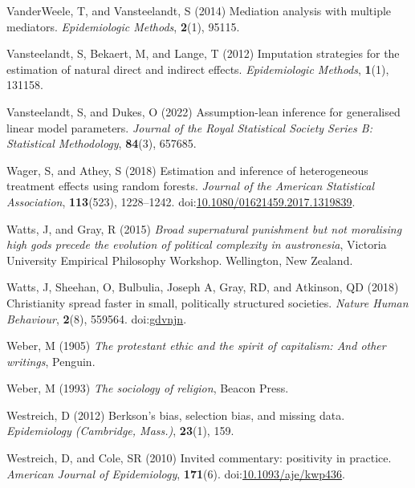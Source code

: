 \documentclass[
  singlecolumn]{article}
\newlength{\cslhangindent}
\newenvironment{CSLReferences}[2] %
 {\begin{list}{}{%
  \setlength{\itemindent}{0pt}
  \setlength{\leftmargin}{0pt}
  \setlength{\parsep}{0pt}
  \ifodd #1
   \setlength{\leftmargin}{\cslhangindent}
   \setlength{\itemindent}{-1\cslhangindent}
  \fi
  \setlength{\itemsep}{#2\baselineskip}}}
 {\end{list}}
\begin{document}
\begin{CSLReferences}{1}{0}
VanderWeele, T, and Vansteelandt, S (2014) Mediation analysis with
multiple mediators. \emph{Epidemiologic Methods}, \textbf{2}(1), 95115.

Vansteelandt, S, Bekaert, M, and Lange, T (2012) Imputation strategies
for the estimation of natural direct and indirect effects.
\emph{Epidemiologic Methods}, \textbf{1}(1), 131158.

Vansteelandt, S, and Dukes, O (2022) Assumption-lean inference for
generalised linear model parameters. \emph{Journal of the Royal
Statistical Society Series B: Statistical Methodology}, \textbf{84}(3),
657685.

Wager, S, and Athey, S (2018) Estimation and inference of heterogeneous
treatment effects using random forests. \emph{Journal of the American
Statistical Association}, \textbf{113}(523), 1228--1242.
doi:\href{https://doi.org/10.1080/01621459.2017.1319839}{10.1080/01621459.2017.1319839}.

Watts, J, and Gray, R (2015) \emph{Broad supernatural punishment but not
moralising high gods precede the evolution of political complexity in
austronesia}, Victoria University Empirical Philosophy Workshop.
Wellington, New Zealand.

Watts, J, Sheehan, O, Bulbulia, Joseph A, Gray, RD, and Atkinson, QD
(2018) Christianity spread faster in small, politically structured
societies. \emph{Nature Human Behaviour}, \textbf{2}(8), 559564.
doi:\href{https://doi.org/gdvnjn}{gdvnjn}.

Weber, M (1905) \emph{The protestant ethic and the spirit of capitalism:
And other writings}, Penguin.

Weber, M (1993) \emph{The sociology of religion}, Beacon Press.

Westreich, D (2012) Berkson's bias, selection bias, and missing data.
\emph{Epidemiology (Cambridge, Mass.)}, \textbf{23}(1), 159.

Westreich, D, and Cole, SR (2010) Invited commentary: positivity in
practice. \emph{American Journal of Epidemiology}, \textbf{171}(6).
doi:\href{https://doi.org/10.1093/aje/kwp436}{10.1093/aje/kwp436}.


\end{CSLReferences}
\end{document}
